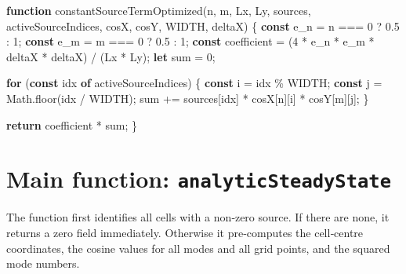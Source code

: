 \documentclass[
  letterpaper,
  DIV=11,
  numbers=noendperiod]{scrreprt}
\newenvironment{Shaded}{\begin{snugshade}}{\end{snugshade}}
\newcommand{\BuiltInTok}[1]{\textcolor[rgb]{0.00,0.23,0.31}{#1}}
\newcommand{\ControlFlowTok}[1]{\textcolor[rgb]{0.00,0.23,0.31}{\textbf{#1}}}
\newcommand{\DecValTok}[1]{\textcolor[rgb]{0.68,0.00,0.00}{#1}}
\newcommand{\FloatTok}[1]{\textcolor[rgb]{0.68,0.00,0.00}{#1}}
\newcommand{\FunctionTok}[1]{\textcolor[rgb]{0.28,0.35,0.67}{#1}}
\newcommand{\KeywordTok}[1]{\textcolor[rgb]{0.00,0.23,0.31}{\textbf{#1}}}
\newcommand{\NormalTok}[1]{\textcolor[rgb]{0.00,0.23,0.31}{#1}}
\newcommand{\OperatorTok}[1]{\textcolor[rgb]{0.37,0.37,0.37}{#1}}
\begin{document}
\label{as-helper}%
\begin{Shaded}
\begin{Highlighting}[]
\KeywordTok{function} \FunctionTok{constantSourceTermOptimized}\NormalTok{(n}\OperatorTok{,}\NormalTok{ m}\OperatorTok{,}\NormalTok{ Lx}\OperatorTok{,}\NormalTok{ Ly}\OperatorTok{,}\NormalTok{ sources}\OperatorTok{,}\NormalTok{ activeSourceIndices}\OperatorTok{,}\NormalTok{ cosX}\OperatorTok{,}\NormalTok{ cosY}\OperatorTok{,}\NormalTok{ WIDTH}\OperatorTok{,}\NormalTok{ deltaX) \{}
    \KeywordTok{const}\NormalTok{ e\_n }\OperatorTok{=}\NormalTok{ n }\OperatorTok{===} \DecValTok{0} \OperatorTok{?} \FloatTok{0.5} \OperatorTok{:} \DecValTok{1}\OperatorTok{;}
    \KeywordTok{const}\NormalTok{ e\_m }\OperatorTok{=}\NormalTok{ m }\OperatorTok{===} \DecValTok{0} \OperatorTok{?} \FloatTok{0.5} \OperatorTok{:} \DecValTok{1}\OperatorTok{;}
    \KeywordTok{const}\NormalTok{ coefficient }\OperatorTok{=}\NormalTok{ (}\DecValTok{4} \OperatorTok{*}\NormalTok{ e\_n }\OperatorTok{*}\NormalTok{ e\_m }\OperatorTok{*}\NormalTok{ deltaX }\OperatorTok{*}\NormalTok{ deltaX) }\OperatorTok{/}\NormalTok{ (Lx }\OperatorTok{*}\NormalTok{ Ly)}\OperatorTok{;}
    \KeywordTok{let}\NormalTok{ sum }\OperatorTok{=} \DecValTok{0}\OperatorTok{;}

    \ControlFlowTok{for}\NormalTok{ (}\KeywordTok{const}\NormalTok{ idx }\KeywordTok{of}\NormalTok{ activeSourceIndices) \{}
        \KeywordTok{const}\NormalTok{ i }\OperatorTok{=}\NormalTok{ idx }\OperatorTok{\%}\NormalTok{ WIDTH}\OperatorTok{;}
        \KeywordTok{const}\NormalTok{ j }\OperatorTok{=} \BuiltInTok{Math}\OperatorTok{.}\FunctionTok{floor}\NormalTok{(idx }\OperatorTok{/}\NormalTok{ WIDTH)}\OperatorTok{;}
\NormalTok{        sum }\OperatorTok{+=}\NormalTok{ sources[idx] }\OperatorTok{*}\NormalTok{ cosX[n][i] }\OperatorTok{*}\NormalTok{ cosY[m][j]}\OperatorTok{;}
\NormalTok{    \}}

    \ControlFlowTok{return}\NormalTok{ coefficient }\OperatorTok{*}\NormalTok{ sum}\OperatorTok{;}
\NormalTok{\}}
\end{Highlighting}
\end{Shaded}

\section{\texorpdfstring{Main function:
\texttt{analyticSteadyState}}{Main function: analyticSteadyState}}\label{main-function-analyticsteadystate}

The function first identifies all cells with a non‑zero source. If there
are none, it returns a zero field immediately. Otherwise it pre‑computes
the cell‑centre coordinates, the cosine values for all modes and all
grid points, and the squared mode numbers.
\end{document}
